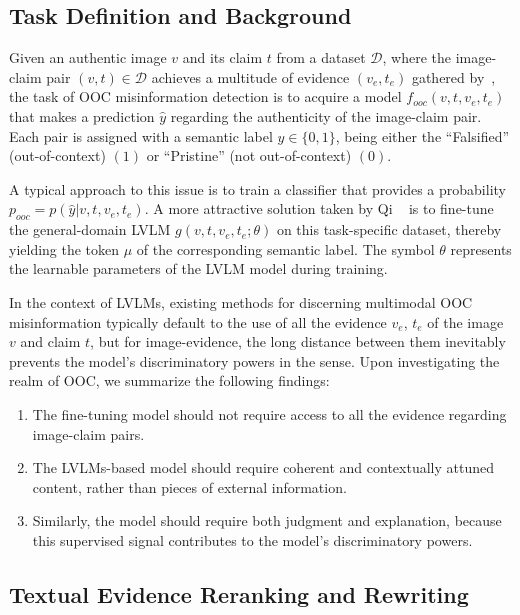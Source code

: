 \subsection{Task Definition and Background}

Given an authentic image $v$ and its claim $t$ from a dataset $\mathcal{D}$, where the image-claim pair $(v,t)\in\mathcal{D}$ achieves a multitude of evidence $(v_e, t_e)$ gathered by~\cite{abdelnabi2022open}, the task of OOC misinformation detection is to acquire a model $f_{ooc}(v,t,v_e, t_e)$ that makes a prediction $\hat{y}$ regarding the authenticity of the image-claim pair. Each pair is assigned with a semantic label $y\in\{0,1\}$, being either the ``Falsified'' (out-of-context) $(1)$ or ``Pristine'' (not out-of-context) $(0)$.

A typical approach to this issue is to train a classifier that provides a probability $p_{ooc}=p(\hat{y}|v,t,v_e, t_e)$. A more attractive solution taken by Qi \etal~\cite{qi2024sniffer} is to fine-tune the general-domain LVLM $g(v,t,v_e, t_e;\theta)$ on this task-specific dataset, thereby yielding the token $\mu$ of the corresponding semantic label. The symbol $\theta$ represents the learnable parameters of the LVLM model during training.

In the context of LVLMs, existing methods for discerning multimodal OOC misinformation typically default to the use of all the evidence $v_e$, $t_e$ of the image $v$ and claim $t$, but for image-evidence, the long distance between them inevitably prevents the model's discriminatory powers in the sense. Upon investigating the realm of OOC, we summarize the following findings:

\begin{enumerate}[label=\arabic*.]
    \item The fine-tuning model should not require access to all the evidence regarding image-claim pairs.
    \item The LVLMs-based model should require coherent and contextually attuned content, rather than pieces of external information.
    \item Similarly, the model should require both judgment and explanation, because this supervised signal contributes to the model's discriminatory powers.
\end{enumerate}

\subsection{Textual Evidence Reranking and Rewriting}

